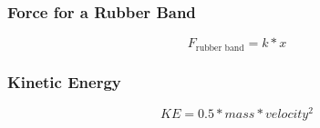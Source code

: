 \documentclass{article}
\begin{document}
	\subsubsection*{\quad Force for a Rubber Band}
	\begin{equation*}
		F_{\text{rubber band}} = k * x
	\end{equation*}
	\subsubsection*{\quad Kinetic Energy}
	\begin{equation*}
		KE = 0.5 * mass * velocity^2
	\end{equation*}
\end{document}

